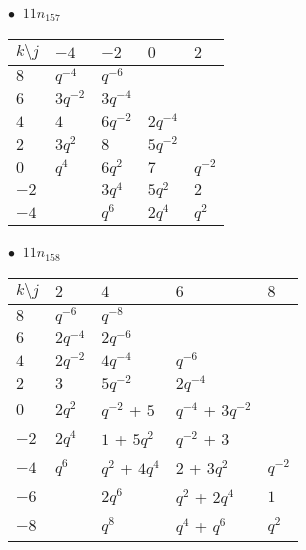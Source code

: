 %
\begin{minipage}{\linewidth}
$\bullet\ $ $11n_{157}$ \vspace{0.5em} \\
\begin{tabular}{l|llll}
$k \setminus j$ & $-4$ & $-2$ & $0$ & $2$ \\
\hline
$8$ & $q^{-4}$ & $q^{-6}$ &  &  \\
$6$ & $3q^{-2}$ & $3q^{-4}$ &  &  \\
$4$ & $4$ & $6q^{-2}$ & $2q^{-4}$ &  \\
$2$ & $3q^{2}$ & $8$ & $5q^{-2}$ &  \\
$0$ & $q^{4}$ & $6q^{2}$ & $7$ & $q^{-2}$ \\
$-2$ &  & $3q^{4}$ & $5q^{2}$ & $2$ \\
$-4$ &  & $q^{6}$ & $2q^{4}$ & $q^{2}$ \\
\end{tabular}
\vspace{2em}
\end{minipage}
%
\begin{minipage}{\linewidth}
$\bullet\ $ $11n_{158}$ \vspace{0.5em} \\
\begin{tabular}{l|llll}
$k \setminus j$ & $2$ & $4$ & $6$ & $8$ \\
\hline
$8$ & $q^{-6}$ & $q^{-8}$ &  &  \\
$6$ & $2q^{-4}$ & $2q^{-6}$ &  &  \\
$4$ & $2q^{-2}$ & $4q^{-4}$ & $q^{-6}$ &  \\
$2$ & $3$ & $5q^{-2}$ & $2q^{-4}$ &  \\
$0$ & $2q^{2}$ & $q^{-2}$ + $5$ & $q^{-4}$ + $3q^{-2}$ &  \\
$-2$ & $2q^{4}$ & $1$ + $5q^{2}$ & $q^{-2}$ + $3$ &  \\
$-4$ & $q^{6}$ & $q^{2}$ + $4q^{4}$ & $2$ + $3q^{2}$ & $q^{-2}$ \\
$-6$ &  & $2q^{6}$ & $q^{2}$ + $2q^{4}$ & $1$ \\
$-8$ &  & $q^{8}$ & $q^{4}$ + $q^{6}$ & $q^{2}$ \\
\end{tabular}
\vspace{2em}
\end{minipage}
%
